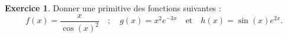 \documentclass[a4paper, 11pt,openany]{article}%
\theoremstyle{plain}
\theoremstyle{definition}
\newtheorem{exo}{Exercice}
\newtheorem{sol}{Solution de l'exercice}
\theoremstyle{remark}
\begin{document}
\begin{exo}
Donner une primitive des fonctions suivantes :
\[ f(x) = \frac{x}{\cos(x)^2}\quad ; \quad g(x) = x^2 e^{-3x}\quad \text{et} \quad h(x) = \sin(x)e^{2x}.\]
\end{exo}
%
\end{document}
